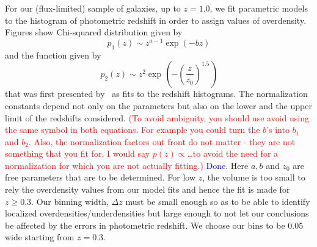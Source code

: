 \documentclass[twocolumn,useAMS,usenatbib]{mn2e}
\newcommand{\rachel}[1]{{\textcolor{red}{#1}}}
\newcommand{\arun}[1]{{\textcolor{blue}{#1}}}
\begin{document}
For our (flux-limited) sample of galaxies, up to $z=1.0$, we fit parametric models to the histogram of photometric redshift in order to assign values of overdensity. Figures show Chi-squared distribution given by
\begin{equation}
 p_1(z) \sim z^{a-1}\exp({-bz})
\end{equation}
and the function given by
\begin{equation}
 p_2(z) \sim z^2\exp{\left(-\left(\frac{z}{z_0}\right)^{1.5}\right)}
\end{equation}
that was first presented by~\cite{Redshift_modelling} as fits to the
redshift histograms. The normalization constants depend not only on the parameters but also on the lower and the upper limit of the redshifts considered. 
\rachel{(To avoid ambiguity, you should use avoid   using the same symbol in both equations.  For example you could turn   the $b$'s into $b_1$ and $b_2$.  Also, the normalization factors out  front do not matter - they are not something that you fit for.  I would say $p(z)\propto$\dots to avoid   the need for a normalization for which you are not actually fitting.)} 
\arun{Done.}
Here $a,b$ and $z_0$ are free parameters that are to be determined.
For low $z$, the volume is too small to rely the overdensity values from our model fits and hence the fit is made for $z \ge 0.3$. Our binning width, $\Delta z$ must be small enough so as to be able to identify localized overdensities/underdensities but large enough to not let our conclusions be affected by the errors in photometric redshift. 
We choose our bins to be $0.05$ wide starting from $z=0.3$. 

\end{document}
